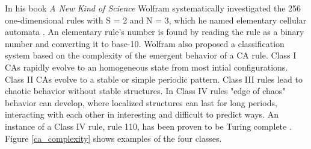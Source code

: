 \documentclass{article}
\begin{document}
\begin{multicols}{2}
\par In his book \textit{A New Kind of Science} Wolfram systematically 
investigated the 256 one-dimensional rules with S = 2 and N = 3, which he named 
elementary cellular automata \cite{wolfram2002new}. An elementary rule's number 
is found by reading the rule as a binary number and converting it to base-10.  
Wolfram also proposed a classification system based on the complexity of the 
emergent behavior of a CA rule. Class I CAs rapidly evolve to an homogeneous 
state from most  intial configurations.  Class II CAs evolve to a stable or 
simple periodic pattern.  Class III rules lead to chaotic behavior without 
stable structures.  In Class IV rules "edge of chaos" behavior can develop, 
       where localized structures can last for long periods, interacting with 
       each other in interesting and difficult to predict ways. An instance of 
       a Class IV rule, rule 110, has been proven to be Turing complete 
       \cite{cook2004universality}. Figure \ref{ca_complexity} shows examples 
       of the four classes.  \par


\end{multicols}
\end{document}

